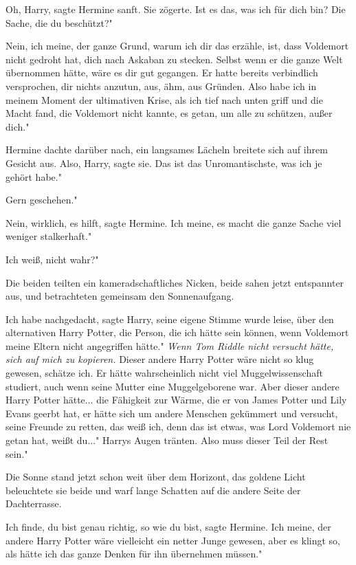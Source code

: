 \glqq{}Oh, Harry\grqq{}, sagte Hermine sanft. Sie zögerte. \glqq{}Ist es das, was
ich für dich bin? Die Sache, die du beschützt?"

\glqq{}Nein, ich meine, der ganze Grund, warum ich dir das erzähle, ist, dass
Voldemort nicht gedroht hat, dich nach Askaban zu stecken. Selbst wenn er die
ganze Welt übernommen hätte, wäre es dir gut gegangen. Er hatte bereits
verbindlich versprochen, dir nichts anzutun, aus, ähm, aus Gründen. Also habe
ich in meinem Moment der ultimativen Krise, als ich tief nach unten griff und
die Macht fand, die Voldemort nicht kannte, es getan, um alle zu schützen, außer
dich."

Hermine dachte darüber nach, ein langsames Lächeln breitete sich auf ihrem
Gesicht aus. \glqq{}Also, Harry\grqq{}, sagte sie. \glqq{}Das ist das
Unromantischste, was ich je gehört habe."

\glqq{}Gern geschehen."

\glqq{}Nein, wirklich, es hilft\grqq{}, sagte Hermine. \glqq{}Ich meine, es macht
die ganze Sache viel weniger stalkerhaft."

\glqq{}Ich weiß, nicht wahr?"

Die beiden teilten ein kameradschaftliches Nicken, beide sahen jetzt entspannter
aus, und betrachteten gemeinsam den Sonnenaufgang.

\glqq{}Ich habe nachgedacht\grqq{}, sagte Harry, seine eigene Stimme wurde leise,
\glqq{}über den alternativen Harry Potter, die Person, die ich hätte sein können,
wenn Voldemort meine Eltern nicht angegriffen hätte."
\emph{Wenn Tom Riddle nicht versucht hätte, sich auf mich zu kopieren.}
\glqq{}Dieser andere Harry Potter wäre nicht so klug gewesen, schätze ich. Er
hätte wahrscheinlich nicht viel Muggelwissenschaft studiert, auch wenn seine
Mutter eine Muggelgeborene war. Aber dieser andere Harry Potter hätte... die
Fähigkeit zur Wärme, die er von James Potter und Lily Evans geerbt hat, er hätte
sich um andere Menschen gekümmert und versucht, seine Freunde zu retten, das
weiß ich, denn das ist etwas, was Lord Voldemort nie getan hat, weißt du..."
Harrys Augen tränten. \glqq{}Also muss dieser Teil der Rest sein."

Die Sonne stand jetzt schon weit über dem Horizont, das goldene Licht
beleuchtete sie beide und warf lange Schatten auf die andere Seite der
Dachterrasse.

\glqq{}Ich finde, du bist genau richtig, so wie du bist\grqq{}, sagte Hermine.
\glqq{}Ich meine, der andere Harry Potter wäre vielleicht ein netter Junge
gewesen, aber es klingt so, als hätte ich das ganze Denken für ihn übernehmen
müssen."

